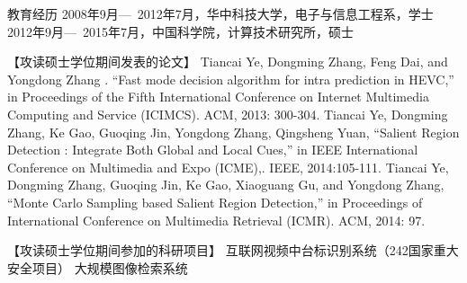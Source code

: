 
\begin{resume}

\begin{resumelist*}{教育经历}
\resumelistitem 2008年9月---~2012年7月，华中科技大学，电子与信息工程系，学士
\resumelistitem 2012年9月---~2015年7月，中国科学院，计算技术研究所，硕士
\end{resumelist*}

\begin{resumelist}{【攻读硕士学位期间发表的论文】}
\resumelistitem Tiancai Ye, Dongming Zhang, Feng Dai, and Yongdong Zhang . “Fast mode decision algorithm for intra prediction in HEVC,” in Proceedings of the Fifth International Conference on Internet Multimedia Computing and Service (ICIMCS). ACM, 2013: 300-304.
\resumelistitem Tiancai Ye, Dongming Zhang, Ke Gao, Guoqing Jin, Yongdong Zhang, Qingsheng Yuan, “Salient Region Detection : Integrate Both Global and Local Cues,” in IEEE International Conference on Multimedia and Expo (ICME),. IEEE, 2014:105-111.
\resumelistitem Tiancai Ye, Dongming Zhang, Guoqing Jin, Ke Gao, Xiaoguang Gu, and Yongdong Zhang, “Monte Carlo Sampling based Salient Region Detection,” in Proceedings of International Conference on Multimedia Retrieval (ICMR). ACM, 2014: 97.
\end{resumelist}

\begin{resumelist}{【攻读硕士学位期间参加的科研项目】}
\resumelistitem 互联网视频中台标识别系统（242国家重大安全项目）
\resumelistitem 大规模图像检索系统
\end{resumelist}

\end{resume}
